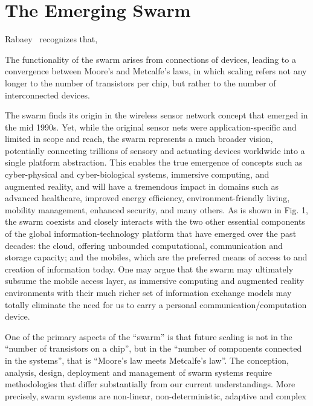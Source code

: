 
\section{The Emerging Swarm}
\label{sec:emerging-swarm}

Rabaey~\cite{rabaey2011swarm} recognizes that,

\begin{displayquote}

  The functionality of the swarm arises from connections of devices, leading to
  a convergence between Moore’s and Metcalfe’s laws, in which scaling refers not
  any longer to the number of transistors per chip, but rather to the number of
  interconnected devices.

\end{displayquote}

 The swarm finds its origin in the
wireless sensor network concept that emerged in the mid 1990s. Yet, while the
original sensor nets were application-specific and limited in scope and reach,
the swarm represents a much broader vision, potentially connecting trillions of
sensory and actuating devices worldwide into a single platform abstraction. This
enables the true emergence of concepts such as cyber-physical and
cyber-biological systems, immersive computing, and augmented reality, and will
have a tremendous impact in domains such as advanced healthcare, improved energy
efficiency, environment-friendly living, mobility management, enhanced security,
and many others. As is shown in Fig. 1, the swarm coexists and closely interacts
with the two other essential components of the global information-technology
platform that have emerged over the past decades: the cloud, offering unbounded
computational, communication and storage capacity; and the mobiles, which are
the preferred means of access to and creation of information today. One may
argue that the swarm may ultimately subsume the mobile access layer, as
immersive computing and augmented reality environments with their much richer
set of information exchange models may totally eliminate the need for us to
carry a personal communication/computation device.

One of the primary aspects of the “swarm” is that future scaling is not in the
“number of transistors on a chip”, but in the “number of components connected in
the systems”, that is “Moore’s law meets Metcalfe’s law”. The conception,
analysis, design, deployment and management of swarm systems require
methodologies that differ substantially from our current understandings.  More
precisely, swarm systems are non-linear, non-deterministic, adaptive and complex


